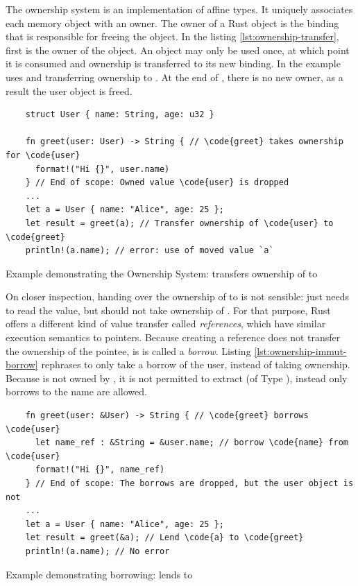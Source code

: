 \documentclass[twoside, english]{sdqthesis}
\theoremstyle{definition}
\begin{document}
The ownership system is an implementation of affine types. It uniquely associates each memory object with an owner. 
The owner of a Rust object is the binding that is responsible for freeing the object. In the listing \ref{lst:ownership-transfer}, first  is the owner of the  object. An object may only be used once, at which point it is consumed and ownership is transferred to its new binding. In the example  uses  and transferring ownership to . At the end of , there is no new owner, as a result the user object is freed.

\begin{listing}[ht]
  \begin{verbatim}
    struct User { name: String, age: u32 }

    fn greet(user: User) -> String { // \code{greet} takes ownership for \code{user}
      format!("Hi {}", user.name)
    } // End of scope: Owned value \code{user} is dropped
    ...
    let a = User { name: "Alice", age: 25 };
    let result = greet(a); // Transfer ownership of \code{user} to \code{greet}
    println!(a.name); // error: use of moved value `a`
  \end{verbatim}
  \caption{Example demonstrating the Ownership System:  transfers ownership of  to }
  \label{lst:ownership-transfer}
\end{listing}

On closer inspection, handing over the ownership of  to  is not sensible:  just needs to read the value, but should not take ownership of . 
For that purpose, Rust offers a different kind of value transfer called \textit{references}, which have similar execution semantics to pointers. Because creating a reference does not transfer the ownership of the pointee, is is called a \textit{borrow}. Listing \ref{lst:ownership-immut-borrow} rephrases  to only take a borrow of the user, instead of taking ownership. Because  is not owned by , it is not permitted to extract  (of Type ), instead only borrows to the name are allowed. 

\begin{listing}[ht]
  \begin{verbatim}
    fn greet(user: &User) -> String { // \code{greet} borrows \code{user}
      let name_ref : &String = &user.name; // borrow \code{name} from \code{user}
      format!("Hi {}", name_ref)
    } // End of scope: The borrows are dropped, but the user object is not
    ...
    let a = User { name: "Alice", age: 25 };
    let result = greet(&a); // Lend \code{a} to \code{greet}
    println!(a.name); // No error
  \end{verbatim}
  \caption{Example demonstrating borrowing:  lends  to }
  \label{lst:ownership-immut-borrow}
\end{listing}
\end{document}
